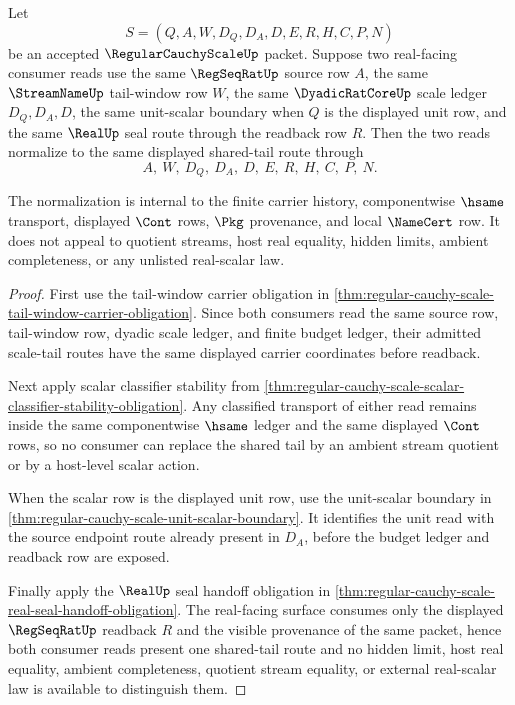 \begin{theorem}
\label{thm:regular-cauchy-scale-shared-tail-normalization}
Let
$$
S=(Q,A,W,D_Q,D_A,D,E,R,H,C,P,N)
$$
be an accepted $\RegularCauchyScaleUp$ packet. Suppose two real-facing consumer reads use the same $\RegSeqRatUp$ source row $A$, the same $\StreamNameUp$ tail-window row $W$, the same $\DyadicRatCoreUp$ scale ledger $D_Q,D_A,D$, the same unit-scalar boundary when $Q$ is the displayed unit row, and the same $\RealUp$ seal route through the readback row $R$. Then the two reads normalize to the same displayed shared-tail route through
$$
A,\ W,\ D_Q,\ D_A,\ D,\ E,\ R,\ H,\ C,\ P,\ N.
$$

The normalization is internal to the finite carrier history, componentwise $\hsame$ transport, displayed $\Cont$ rows, $\Pkg$ provenance, and local $\NameCert$ row. It does not appeal to quotient streams, host real equality, hidden limits, ambient completeness, or any unlisted real-scalar law.
\end{theorem}
\begin{proof}
First use the tail-window carrier obligation in \autoref{thm:regular-cauchy-scale-tail-window-carrier-obligation}. Since both consumers read the same source row, tail-window row, dyadic scale ledger, and finite budget ledger, their admitted scale-tail routes have the same displayed carrier coordinates before readback.

Next apply scalar classifier stability from \autoref{thm:regular-cauchy-scale-scalar-classifier-stability-obligation}. Any classified transport of either read remains inside the same componentwise $\hsame$ ledger and the same displayed $\Cont$ rows, so no consumer can replace the shared tail by an ambient stream quotient or by a host-level scalar action.

When the scalar row is the displayed unit row, use the unit-scalar boundary in \autoref{thm:regular-cauchy-scale-unit-scalar-boundary}. It identifies the unit read with the source endpoint route already present in $D_A$, before the budget ledger and readback row are exposed.

Finally apply the $\RealUp$ seal handoff obligation in \autoref{thm:regular-cauchy-scale-real-seal-handoff-obligation}. The real-facing surface consumes only the displayed $\RegSeqRatUp$ readback $R$ and the visible provenance of the same packet, hence both consumer reads present one shared-tail route and no hidden limit, host real equality, ambient completeness, quotient stream equality, or external real-scalar law is available to distinguish them.
\end{proof}

